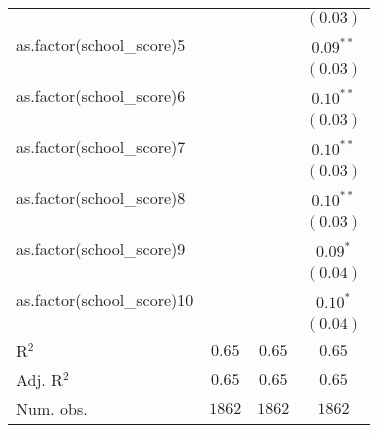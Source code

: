 \begin{center}
\begin{longtable}{l c c c}
                           &               &               & $(0.03)$      \\
as.factor(school\_score)5  &               &               & $0.09^{**}$   \\
                           &               &               & $(0.03)$      \\
as.factor(school\_score)6  &               &               & $0.10^{**}$   \\
                           &               &               & $(0.03)$      \\
as.factor(school\_score)7  &               &               & $0.10^{**}$   \\
                           &               &               & $(0.03)$      \\
as.factor(school\_score)8  &               &               & $0.10^{**}$   \\
                           &               &               & $(0.03)$      \\
as.factor(school\_score)9  &               &               & $0.09^{*}$    \\
                           &               &               & $(0.04)$      \\
as.factor(school\_score)10 &               &               & $0.10^{*}$    \\
                           &               &               & $(0.04)$      \\
\hline
R$^2$                      & $0.65$        & $0.65$        & $0.65$        \\
Adj. R$^2$                 & $0.65$        & $0.65$        & $0.65$        \\
Num. obs.                  & $1862$        & $1862$        & $1862$        \\
\end{longtable}
\end{center}
